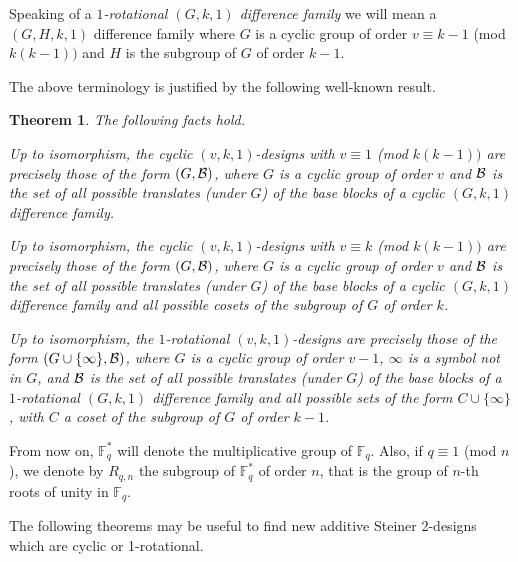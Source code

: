 \documentclass[a4paper, 11pt]{article}
\newtheorem{theorem}{Theorem}[section]
\theoremstyle{definition}
\theoremstyle{definition}
\theoremstyle{definition}
\newcommand{\F}{\mathbb{F}}
\numberwithin{equation}{section}
\begin{document}
Speaking of a {\it $1$-rotational $(G,k,1)$ difference family} we will mean a $(G,H,k,1)$ difference family where $G$ is a cyclic group
of order $v\equiv k-1$ (mod $k(k-1))$ and $H$ is the subgroup of $G$ of order $k-1$.

The above terminology is justified by the following well-known result.
\begin{theorem}\label{designs via DFs} The following facts hold.
\item[(i)] Up to isomorphism, the cyclic $(v,k,1)$-designs with $v\equiv1$ (mod $k(k-1))$ are precisely those of the form $(G,{\cal B})$, where $G$ is a cyclic group of order $v$ and $\cal B$ is the set of all possible translates (under $G$) of the base blocks of a cyclic $(G,k,1)$ difference family.
\item[(ii)] Up to isomorphism, the cyclic $(v,k,1)$-designs with $v\equiv k$ (mod $k(k-1))$ are precisely 
those of the form $(G,{\cal B})$, where $G$ is a cyclic group of order $v$
and $\cal B$ is the set of all possible translates (under $G$) of the base blocks of a cyclic $(G,k,1)$ difference family and all possible cosets
of the subgroup of $G$ of order $k$.
\item[(iii)] Up to isomorphism, the $1$-rotational $(v,k,1)$-designs are precisely those of the form $(G\cup\{\infty\},{\cal B})$, where $G$ is a cyclic group of order $v-1$,
$\infty$ is a symbol not in $G$, and $\cal B$ is the set of all possible translates (under $G$) of the base blocks of a $1$-rotational $(G,k,1)$ difference 
family and all possible sets of the form $C\cup\{\infty\}$, with $C$ a coset of the subgroup of $G$ of order $k-1$.
\end{theorem}

From now on, $\F_q^*$ will denote the multiplicative group of $\F_q$.
Also, if $q\equiv 1$ (mod $n$), we denote by $R_{q,n}$ the subgroup of $\F_q^*$ of order $n$,
that is the group of $n$-th roots of unity in $\F_q$. 

The following theorems may be useful to find new additive Steiner 2-designs which are cyclic
or 1-rotational.
\end{document}
